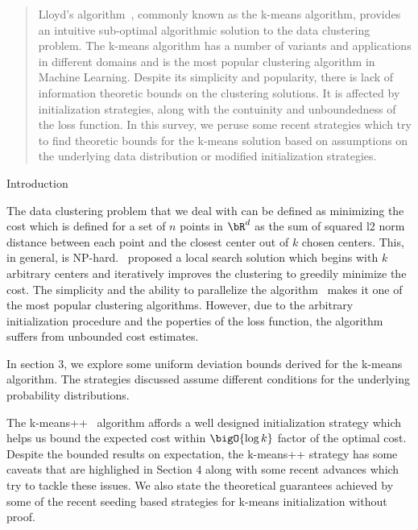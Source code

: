 \documentclass[10pt]{article}
\begin{document}
\makeheader%

\begin{abstract}
    Lloyd's algorithm~\citep{kmeans}, commonly known as the k-means algorithm, provides
    an intuitive sub-optimal algorithmic solution to the data clustering problem.
    The k-means algorithm has a number of variants and applications in different domains
    and is the most popular clustering algorithm in Machine Learning. Despite its
    simplicity and popularity, there is lack of information theoretic bounds on the
    clustering solutions. It is affected by initialization strategies, along with the
    contuinity and unboundedness of the loss function. In this survey, we peruse some
    recent strategies which try to find theoretic bounds for the k-means solution based 
    on assumptions on the underlying data distribution or modified initialization
    strategies.
\end{abstract}

\begin{psection}{Introduction}

    The data clustering problem that we deal with can be defined as minimizing the cost
    which is defined for a set of $n$ points in $\bR^d$ as the sum of squared l2 norm
    distance between each point and the closest center out of $k$ chosen centers. This,
    in general, is NP-hard.~\cite{kmeans} proposed a local search solution which begins
    with $k$ arbitrary centers and iteratively improves the clustering to greedily
    minimize the cost. The simplicity and the ability to parallelize the
    algorithm~\citep{parallel-kmeans} makes it one of the most popular clustering
    algorithms. However, due to the arbitrary initialization procedure and the poperties
    of the loss function, the algorithm suffers from unbounded cost estimates.

    In section 3, we explore some uniform deviation bounds derived for the k-means
    algorithm. The strategies discussed assume different conditions for the underlying
    probability distributions.

    The k-means++~\citep{kmeanspp} algorithm affords a well designed initialization
    strategy which helps us bound the expected cost within $\bigO{\log k}$ factor of the
    optimal cost. Despite the bounded results on expectation, the k-means++ strategy has
    some caveats that are highlighed in Section 4 along with some recent advances which
    try to tackle these issues. We also state the theoretical guarantees achieved by
    some of the recent seeding based strategies for k-means initialization without
    proof.

\end{psection}
\end{document}
